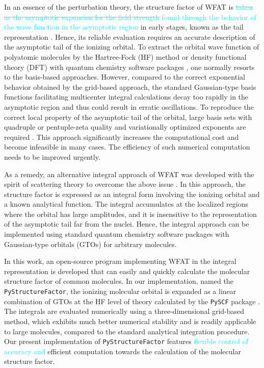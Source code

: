 \documentclass[preprint,12pt]{elsarticle} %
\newcommand{\cyan}[1]{\textcolor{cyan}{#1}}     %
\newcommand{\cout}[1]{\textcolor{cyan}{\sout{#1}}}
\begin{document}
In an essence of the perturbation theory, the structure factor of WFAT is \cout{taken as the asymptotic expansion for the field strength} \cyan{found through the behavior of the wave function in the asymptotic region} in early stages, known as the tail representation \cite{madsen_structure_2013, trinh_weak-field_2015, madsen_application_2014}. Hence, its reliable evaluation requires an accurate description of the asymptotic tail of the ionizing orbital. To extract the orbital wave function of polyatomic molecules by the Hartree-Fock (HF) method or density functional theory (DFT) with quantum chemistry software packages \cite{madsen_application_2014, saito_structure_2015}, one normally resorts to the basis-based approaches. However, compared to the correct exponential behavior obtained by the grid-based approach, the standard Gaussian-type basis functions facilitating multicenter integral calculations decay too rapidly in the asymptotic region and thus could result in erratic oscillations. To reproduce the correct local property of the asymptotic tail of the orbital, large basis sets with quadruple or pentuple-zeta quality and variationally optimized exponents are required \cite{trinh_first-order_2013}. This approach significantly increases the computational cost and become infeasible in many cases. The efficiency of such numerical computation needs to be improved urgently.

As a remedy, an alternative integral approach of WFAT was developed with the spirit of scattering theory to overcome the above issue \cite{madsen_structure_2017, dnestryan_structure_2018, samygin_weak-field_2018}. In this approach, the structure factor is expressed as an integral form involving the ionizing orbital and a known analytical function. The integral accumulates at the localized regions where the orbital has large amplitudes, and it is insensitive to the representation of the asymptotic tail far from the nuclei. Hence, the integral approach can be implemented using standard quantum chemistry software packages with Gaussian-type orbitals (GTOs) for arbitrary molecules.

In this work, an open-source program implementing WFAT in the integral representation is developed that can easily and quickly calculate the molecular structure factor of common molecules. In our implementation, named the \texttt{PyStructureFactor}, the ionizing molecular orbital is expanded as a linear combination of GTOs at the HF level of theory calculated by the \texttt{PySCF} package \cite{sun_pyscf_2018, sun_recent_2020}. The integrals are evaluated numerically using a three-dimensional grid-based method, which exhibits much better numerical stability and is readily applicable to large molecules, compared to the standard analytical integration procedure. Our present implementation of \texttt{PyStructureFactor} features \cyan{flexible control of accuracy and} efficient computation towards the calculation of the molecular structure factor.
\end{document}
